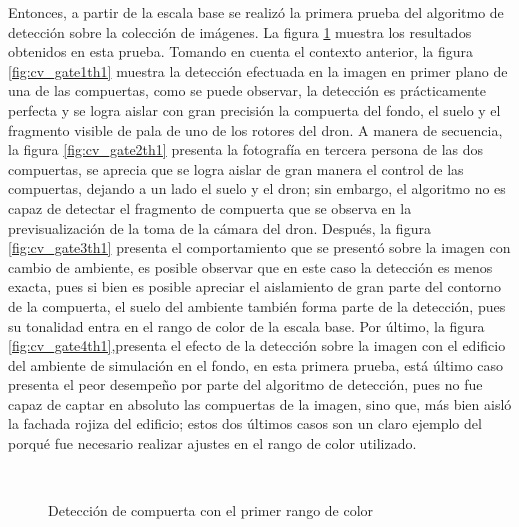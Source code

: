 Entonces, a partir de la escala base se realizó la primera prueba del algoritmo de detección sobre la colección de imágenes. La figura \ref{fig:cv_gatesth1} muestra los resultados obtenidos en esta prueba. Tomando en cuenta el contexto anterior, la figura \ref{fig:cv_gate1th1} muestra la detección efectuada en la imagen en primer plano de una de las compuertas, como se puede observar, la detección es prácticamente perfecta y se logra aislar con gran precisión la compuerta del fondo, el suelo y el fragmento visible de pala de uno de los rotores del dron. A manera de secuencia, la figura \ref{fig:cv_gate2th1} presenta la fotografía en tercera persona de las dos compuertas, se aprecia que se logra aislar de gran manera el control de las compuertas, dejando a un lado el suelo y el dron;  sin embargo, el algoritmo no es capaz de detectar el fragmento de compuerta que se observa en la previsualización de la toma de la cámara del dron. Después, la figura \ref{fig:cv_gate3th1} presenta el comportamiento que se presentó sobre la imagen con cambio de ambiente, es posible observar que en este caso la detección es menos exacta, pues si bien es posible apreciar el aislamiento de gran parte del contorno de la compuerta, el suelo del ambiente también forma parte de la detección, pues su tonalidad entra en el rango de color de la escala base. Por último, la figura \ref{fig:cv_gate4th1},presenta el efecto de la detección sobre la imagen con el edificio del ambiente de simulación en el fondo, en esta primera prueba, está último caso presenta el peor desempeño por parte del algoritmo de detección, pues no fue capaz de captar en absoluto las compuertas de la imagen, sino que, más bien aisló la fachada rojiza del edificio; estos dos últimos casos son un claro ejemplo del porqué fue necesario realizar ajustes en el rango de color utilizado.


\begin{figure}[ht]
    \centering
    \hfill
    \\
    \hfill
    \hfill

    \caption{Detección de compuerta con el primer rango de color}
    \label{fig:cv_gatesth1}
\end{figure}

